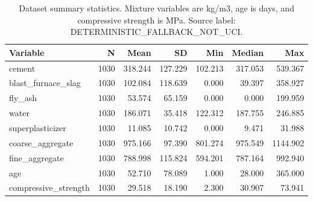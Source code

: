 \begin{table}
\caption{Dataset summary statistics. Mixture variables are kg/m3, age is days, and compressive strength is MPa. Source label: DETERMINISTIC_FALLBACK_NOT_UCI.}
\label{tab:dataset-summary}
\begin{tabular}{lrrrrrr}
\toprule
Variable & N & Mean & SD & Min & Median & Max \\
\midrule
cement & 1030 & 318.244 & 127.229 & 102.213 & 317.053 & 539.367 \\
blast\_furnace\_slag & 1030 & 102.084 & 118.639 & 0.000 & 39.397 & 358.927 \\
fly\_ash & 1030 & 53.574 & 65.159 & 0.000 & 0.000 & 199.959 \\
water & 1030 & 186.071 & 35.418 & 122.312 & 187.755 & 246.885 \\
superplasticizer & 1030 & 11.085 & 10.742 & 0.000 & 9.471 & 31.988 \\
coarse\_aggregate & 1030 & 975.166 & 97.390 & 801.274 & 975.549 & 1144.902 \\
fine\_aggregate & 1030 & 788.998 & 115.824 & 594.201 & 787.164 & 992.940 \\
age & 1030 & 52.710 & 78.089 & 1.000 & 28.000 & 365.000 \\
compressive\_strength & 1030 & 29.518 & 18.190 & 2.300 & 30.907 & 73.941 \\
\bottomrule
\end{tabular}
\end{table}
